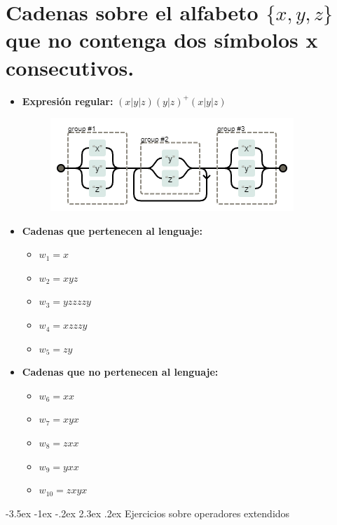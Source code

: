 \documentclass[11pt]{report}
\makeatletter
\renewcommand\chapter{\@startsection{chapter}{0}{\z@}%
    {-3.5ex \@plus -1ex \@minus -.2ex}%
    {2.3ex \@plus.2ex}%
    {\normalfont\Large\bfseries}}
\makeatother
\begin{document}
\section{Cadenas sobre el alfabeto \texorpdfstring{$\{x,y,z\}$}{\{x,y,z\}} que no contenga dos símbolos x consecutivos.}
\begin{itemize}
  \item \textbf{Expresión regular:} $(x|y|z)(y|z)^+(x|y|z)$
    \begin{figure}[H]
      \centering
      \includegraphics[scale=0.9]{img/op_basicos_10.png}
    \end{figure}
  \item \textbf{Cadenas que pertenecen al lenguaje: }
    \begin{itemize}
      \item $w_1 = x$
      \item $w_2 = xyz$
      \item $w_3 = yzzzzy$
      \item $w_4 = xzzzy$
      \item $w_5 = zy$
    \end{itemize}
  \item \textbf{Cadenas que no pertenecen al lenguaje: }
    \begin{itemize}
      \item $w_6 = xx$
      \item $w_7 = xyx$
      \item $w_8 = zxx$
      \item $w_9 = yxx$
      \item $w_{10} = zxyx$
    \end{itemize}
\end{itemize}

\newpage

\chapter{Ejercicios sobre operadores extendidos}
\end{document}
